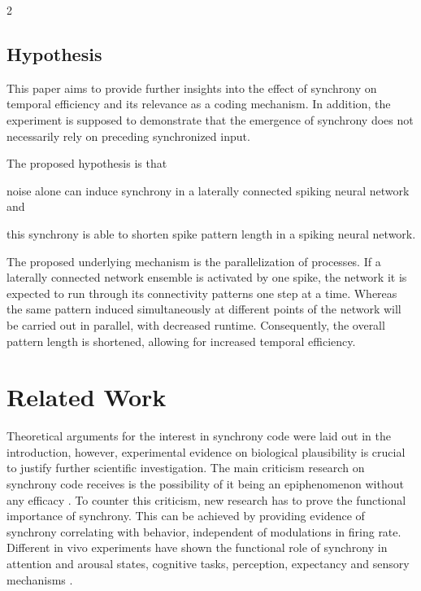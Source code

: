 \documentclass[12pt,a4paper]{article}
\begin{document}
\begin{multicols}{2}
        \subsection{Hypothesis}
            This paper aims to provide further insights into the effect of synchrony on temporal efficiency and its relevance as a coding mechanism. In addition, the experiment is supposed to demonstrate that the emergence of synchrony does not necessarily rely on preceding synchronized input.

            The proposed hypothesis is that 
            \begin{enumerate*}[label=(\arabic*)]
                \item\label{hyp1} noise alone can induce synchrony in a laterally connected spiking neural network and
                \item\label{hyp2} this synchrony is able to shorten spike pattern length in a spiking neural network. 
            \end{enumerate*}
            The proposed underlying mechanism is the parallelization of processes. If a laterally connected network ensemble is activated by one spike, the network it is expected to run through its connectivity patterns one step at a time. Whereas the same pattern induced simultaneously at different points of the network will be carried out in parallel, with decreased runtime. Consequently, the overall pattern length is shortened, allowing for increased temporal efficiency.


        \section{Related Work}
            Theoretical arguments for the interest in synchrony code were laid out in the introduction, however, experimental evidence on biological plausibility is crucial to justify further scientific investigation. The main criticism research on synchrony code receives is the possibility of it being an epiphenomenon without any efficacy \cite{G}. To counter this criticism, new research has to prove the functional importance of synchrony. This can be achieved by providing evidence of synchrony correlating with behavior, independent of modulations in firing rate.
            Different in vivo experiments have shown the functional role of synchrony in attention and arousal states, cognitive tasks, perception, expectancy and sensory mechanisms \cite{G}.
            

\end{multicols}
\end{document}
